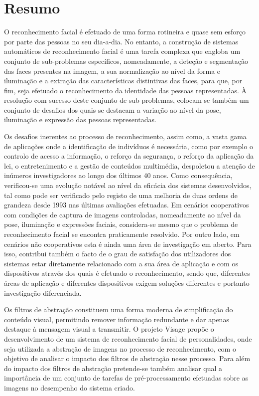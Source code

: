 \chapter*{Resumo}
O reconhecimento facial é efetuado de uma forma rotineira e quase sem esforço por parte das pessoas no seu dia-a-dia. No entanto, a construção de sistemas automáticos de reconhecimento facial é uma tarefa complexa que engloba um conjunto de sub-problemas específicos, nomeadamente, a deteção e segmentação das faces presentes na imagem, a sua normalização ao nível da forma e iluminação e a extração das características distintivas das faces, para que, por fim, seja efetuado o reconhecimento da identidade das pessoas representadas. À resolução com sucesso deste conjunto de sub-problemas, colocam-se também um conjunto de desafios dos quais se destacam a variação ao nível da pose, iluminação e expressão das pessoas representadas.

Os desafios inerentes ao processo de reconhecimento, assim como, a vasta gama de aplicações onde a identificação de indivíduos é necessária, como por exemplo o controlo de acesso a informação, o reforço da segurança, o reforço da aplicação da lei, o entretenimento e a gestão de conteúdos multimédia, despoletou a atenção de inúmeros investigadores ao longo dos últimos 40 anos. Como consequência, verificou-se uma evolução notável ao nível da eficácia dos sistemas desenvolvidos, tal como pode ser verificado pelo registo de uma melhoria de duas ordens de grandeza desde 1993 nas últimas avaliações efetuadas. Em cenários cooperativos com condições de captura de imagens controladas, nomeadamente ao nível da pose, iluminação e expressões faciais, considera-se mesmo que o problema de reconhecimento facial se encontra praticamente resolvido. Por outro lado, em cenários não cooperativos esta é ainda uma área de investigação em aberto. Para isso, contribui também o facto de o grau de satisfação dos utilizadores dos sistemas estar diretamente relacionado com a sua área de aplicação e com os dispositivos através dos quais é efetuado o reconhecimento, sendo que, diferentes áreas de aplicação e diferentes dispositivos exigem soluções diferentes e portanto investigação diferenciada.

Os filtros de abstração constituem uma forma moderna de simplificação do conteúdo visual, permitindo remover informação redundante e dar apenas destaque à mensagem visual a transmitir. O projeto Visage propõe o desenvolvimento de um sistema de reconhecimento facial de personalidades, onde seja utilizada a abstração de imagens no processo de reconhecimento, com o objetivo de analisar o impacto dos filtros de abstração nesse processo. Para além do impacto dos filtros de abstração pretende-se também analisar qual a importância de um conjunto de tarefas de pré-processamento efetuadas sobre as imagens no desempenho do sistema criado.

